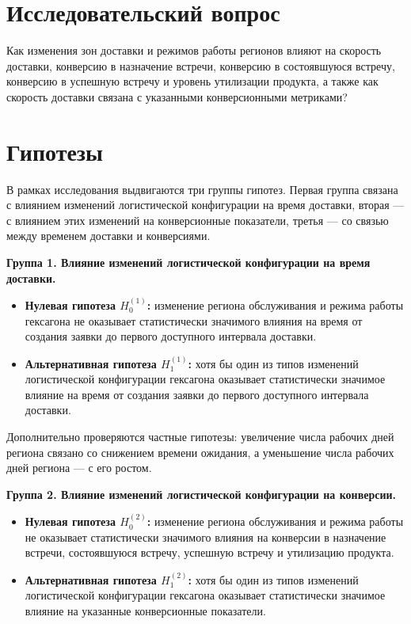 \documentclass[14pt,a4paper]{extarticle}
\begin{document}
\section{Исследовательский вопрос}

Как изменения зон доставки и режимов работы регионов влияют на скорость доставки, конверсию в назначение встречи, конверсию в состоявшуюся встречу, конверсию в успешную встречу и уровень утилизации продукта, а также как скорость доставки связана с указанными конверсионными метриками?

\section{Гипотезы}

В рамках исследования выдвигаются три группы гипотез. Первая группа связана с влиянием изменений логистической конфигурации на время доставки, вторая --- с влиянием этих изменений на конверсионные показатели, третья --- со связью между временем доставки и конверсиями.

\textbf{Группа 1. Влияние изменений логистической конфигурации на время доставки.}
\begin{itemize}
    \item \textbf{Нулевая гипотеза $H^{(1)}_0$:} изменение региона обслуживания и режима работы гексагона не оказывает статистически значимого влияния на время от создания заявки до первого доступного интервала доставки.
    \item \textbf{Альтернативная гипотеза $H^{(1)}_1$:} хотя бы один из типов изменений логистической конфигурации гексагона оказывает статистически значимое влияние на время от создания заявки до первого доступного интервала доставки.
\end{itemize}
Дополнительно проверяются частные гипотезы: увеличение числа рабочих дней региона связано со снижением времени ожидания, а уменьшение числа рабочих дней региона --- с его ростом.

\textbf{Группа 2. Влияние изменений логистической конфигурации на конверсии.}
\begin{itemize}
    \item \textbf{Нулевая гипотеза $H^{(2)}_0$:} изменение региона обслуживания и режима работы не оказывает статистически значимого влияния на конверсии в назначение встречи, состоявшуюся встречу, успешную встречу и утилизацию продукта.
    \item \textbf{Альтернативная гипотеза $H^{(2)}_1$:} хотя бы один из типов изменений логистической конфигурации гексагона оказывает статистически значимое влияние на указанные конверсионные показатели.
\end{itemize}
\end{document}
